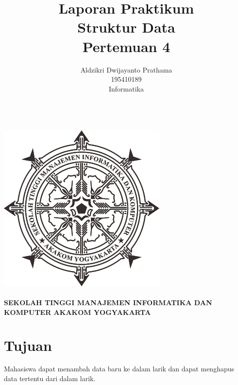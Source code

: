 \documentclass[a4paper,12pt]{article}
\begin{document}
\title{ {\Large Laporan Praktikum}\\ Struktur Data\\{\Large Pertemuan 4}}

\author{Aldzikri Dwijayanto Prathama
    \\195410189
    \\Informatika}
\makeatletter
\begin{titlepage}
    \begin{center}
        {\huge \bfseries \@title}\\[14ex]
        \includegraphics[scale=.8]{logo}\\[4ex]
        {\large \@author}\\[12ex]
        {\large \bfseries {SEKOLAH TINGGI MANAJEMEN INFORMATIKA DAN KOMPUTER
            AKAKOM YOGYAKARTA}}
    \end{center}


\end{titlepage}
\makeatother
\newpage
\tableofcontents
\newpage

\section{Tujuan}
Mahasiswa dapat menambah data baru ke dalam larik dan dapat menghapus data tertentu dari dalam larik.
\end{document}
